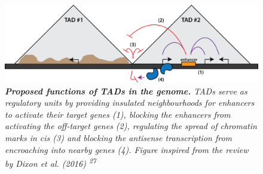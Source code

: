 \documentclass[11pt,twoside]{MPIthesis}
\theoremstyle{definition}
\theoremstyle{definition}
\theoremstyle{definition}
\theoremstyle{remark}
\begin{document}
\begin{figure}

{\centering \includegraphics[width=0.8\linewidth]{figures/intro_fig2} 

}

\caption[Proposed functions of TADs in the genome]{\emph{\textbf{Proposed functions of TADs in the genome.} TADs
serve as regulatory units by providing insulated neighbourhoods for
enhancers to activate their target genes (1), blocking the enhancers
from activating the off-target genes (2), regulating the spread of
chromatin marks in cis (3) and blocking the antisense transcription from
encroaching into nearby genes (4). Figure inspired from the review by
Dixon et al. (2016) \textsuperscript{27}}}\label{fig:unnamed-chunk-2}
\end{figure}
\end{document}

